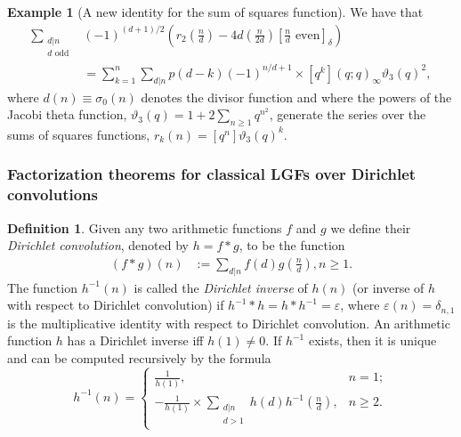 \documentclass[12pt,reqno,a4letter]{article}
\numberwithin{figure}{section}
\numberwithin{table}{section}
\numberwithin{equation}{section}
\newcommand{\Iverson}[1]{\ensuremath{\left[#1\right]_{\delta}}}
\theoremstyle{plain}
\numberwithin{theorem}{section}
\theoremstyle{definition}
\newtheorem{example}[theorem]{Example}
\newtheorem{definition}[theorem]{Definition}
\begin{document}
\begin{example}[A new identity for the sum of squares function]
We have that 
\begin{align*} 
\sum_{\substack{d|n \\ d\text{ odd}}} & (-1)^{(d+1)/2} \left(r_2\left(\frac{n}{d}\right) 
     -4 d\left(\frac{n}{2d}\right) \Iverson{\frac{n}{d}\text{ even}}\right) \\ 
     & = 
     \sum_{k=1}^n \sum_{d|n} p(d-k) (-1)^{n/d+1} \times [q^k] (q; q)_{\infty} \vartheta_3(q)^2, 
\end{align*} 
where $d(n) \equiv \sigma_0(n)$ denotes the divisor function and where the 
powers of the Jacobi theta function, $\vartheta_3(q) = 1 + 2 \sum_{n \geq 1} q^{n^2}$, 
generate the series over the sums of squares functions, 
$r_k(n) = [q^n] \vartheta_3(q)^k$. 
\end{example}

\subsubsection{Factorization theorems for classical LGFs over Dirichlet convolutions} 
\label{Section_LSFactThms_CvlOfTwoFns_and_Apps}

\begin{definition}
Given any two arithmetic functions $f$ and $g$ we define their \emph{Dirichlet convolution}, 
denoted by $h = f \ast g$, to be the function \cite[\S 2.6]{APOSTOLANUMT}
\begin{align*} 
(f \ast g)(n) & := \sum_{d|n} f(d) g\left(\frac{n}{d}\right), n \geq 1.
\end{align*} 
The function $h^{-1}(n)$ is called the \emph{Dirichlet inverse} of $h(n)$ 
(or inverse of $h$ with respect to Dirichlet convolution) if 
$h^{-1} \ast h = h \ast h^{-1} = \varepsilon$, where $\varepsilon(n) = \delta_{n,1}$ 
is the multiplicative identity with respect to Dirichlet convolution. 
An arithmetic function $h$ has a Dirichlet inverse iff $h(1) \neq 0$. 
If $h^{-1}$ exists, then it is unique and can be computed recursively by the formula 
\[
h^{-1}(n) = \begin{cases} 
     \frac{1}{h(1)}, & n = 1; \\ 
     -\frac{1}{h(1)} \times 
     \sum\limits_{\substack{d|n \\ d>1}} h(d) h^{-1}\left(\frac{n}{d}\right), & n \geq 2. 
     \end{cases} 
\]
\end{definition}
\end{document}
